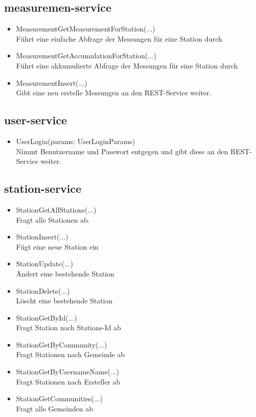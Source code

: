 \documentclass[10pt,a4paper,margin=0pt]{scrartcl}
\begin{document}
\subsection{measuremen-service}
\begin{itemize}
	\item MeasurementGetMeasurementForStation(...)\\
	Führt eine einfache Abfrage der Messungen für eine Station durch
	\item MeasurementGetAccumulationForStation(...)\\
	Führt eine akkumulierte Abfrage der Messungen für eine Station durch
	\item MeasurementInsert(...)\\
	Gibt eine neu erstelle Messungen an den REST-Service weiter.
\end{itemize}
\subsection{user-service}
\begin{itemize}
	\item UserLogin(params: UserLoginParams)\\
	Nimmt Benutzername und Passwort entgegen und gibt diese an den REST-Service weiter.
\end{itemize}
\pagebreak
\subsection{station-service}
\begin{itemize}
	\item StationGetAllStations(...)\\
	Fragt alle Stationen ab.
	\item StationInsert(...)\\
	Fügt eine neue Station ein
	\item StationUpdate(...)\\
	Ändert eine bestehende Station
	\item StationDelete(...)\\
	Löscht eine bestehende Station
	\item StationGetById(...)\\
	Fragt Station nach Stations-Id ab
	\item StationGetByCommunity(...)\\
	Fragt Stationen nach Gemeinde ab
	\item StationGetByUsernameName(...)\\
	Fragt Stationen nach Ersteller ab
	\item StationGetCommunities(...)\\
	Fragt alle Gemeinden ab 
\end{itemize}
\end{document}
